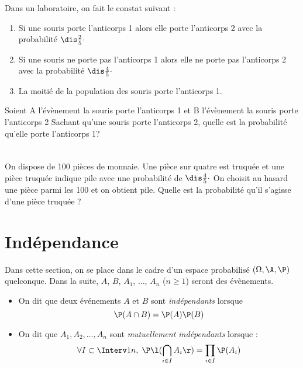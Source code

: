 \documentclass[a4paper,10pt]{report}
\begin{document}
\begin{ex} Dans un laboratoire, on fait le constat suivant :
\begin{enumerate}
\item Si une souris porte l'anticorps 1 alors elle porte l'anticorps 2 avec la probabilité $\dis \frac{2}{5} \cdot$

\vspace{-0.2cm}
\item Si une souris ne porte pas l'anticorps 1 alors elle ne porte pas l'anticorps 2 avec la probabilité $\dis \frac{4}{5} \cdot$
\item La moitié de la population des souris porte l'anticorps 1.
\end{enumerate}

\medskip
\noindent Soient A l'évènement \og la souris porte l'anticorps 1 \fg et B l'évènement \og la souris porte l'anticorps 2 \fg 
\noindent Sachant qu'une souris porte l'anticorps 2, quelle est la probabilité qu'elle porte l'anticorps 1?

\vspace{6cm}
\end{ex}

\newpage

$\phantom{test}$

\vspace{4cm}

\begin{exa} On dispose de 100 pièces de monnaie. Une pièce sur quatre est truquée et une pièce truquée indique pile avec une probabilité de $\dis \frac{4}{5} \cdot$ On choisit au hasard une pièce parmi les 100 et on obtient pile. Quelle est la probabilité qu'il s'agisse d'une pièce truquée ?
\end{exa}

\section{Indépendance}
\noindent Dans cette section, on se place dans le cadre d'un espace probabilisé $(\Omega, \A, \P)$ quelconque. Dans la suite, $A$, $B$, $A_1$, $\ldots$, $A_n$ ($n \geq 1$) seront des évènements.



\begin{defin}
\begin{itemize}
 \item On dit que deux événements $A$ et $B$ sont \textit{indépendants} lorsque 
$$\P(A \cap B)= \P(A)\P(B)$$
 \item On dit que $A_1,A_2,\ldots,A_n$ sont \textit{mutuellement indépendants} lorsque :
$$\forall I \subset \Interv 1n,\;\P\l(\bigcap_{i \in I}A_i\r)= \prod_{i \in I}\P(A_i)$$
\end{itemize}
\end{defin}
\end{document}
